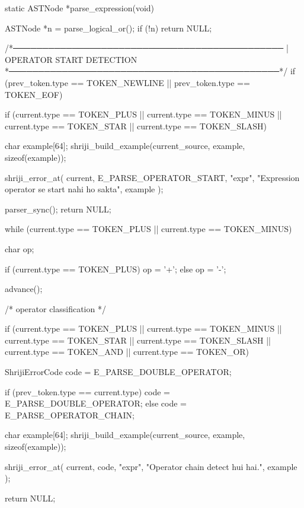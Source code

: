 \documentclass{article}
\begin{document}
static ASTNode *parse_expression(void)
{
   ASTNode *n = parse_logical_or();
    if (!n) return NULL;




/*──────────────────────────────────────────────
 | OPERATOR START DETECTION
 *──────────────────────────────────────────────*/
if (prev_token.type == TOKEN_NEWLINE ||
    prev_token.type == TOKEN_EOF)
{
    if (current.type == TOKEN_PLUS ||
        current.type == TOKEN_MINUS ||
        current.type == TOKEN_STAR ||
        current.type == TOKEN_SLASH)
    {

        char example[64];
        shriji_build_example(current_source, example, sizeof(example));

        shriji_error_at(
            current,
            E_PARSE_OPERATOR_START,
            "expr",
            "Expression operator se start nahi ho sakta",
            example
        );

        parser_sync();
        return NULL;
    }
}



while (current.type == TOKEN_PLUS  ||
       current.type == TOKEN_MINUS)
{
    char op;

    if (current.type == TOKEN_PLUS) op = '+';
    else op = '-';

    advance();







/* operator classification */

if (current.type == TOKEN_PLUS  ||
    current.type == TOKEN_MINUS ||
    current.type == TOKEN_STAR  ||
    current.type == TOKEN_SLASH ||
    current.type == TOKEN_AND   ||
    current.type == TOKEN_OR)
{
    ShrijiErrorCode code = E_PARSE_DOUBLE_OPERATOR;

    if (prev_token.type == current.type)
    {
        code = E_PARSE_DOUBLE_OPERATOR;
    }
    else
    {
        code = E_PARSE_OPERATOR_CHAIN;
    }






char example[64];
shriji_build_example(current_source, example, sizeof(example));

shriji_error_at(
    current,
    code,
    "expr",
    "Operator chain detect hui hai.",
    example
);

return NULL;

}












}}
\end{document}
